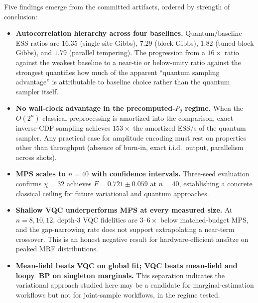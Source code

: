 \documentclass[conference,10pt]{IEEEtran}
\begin{document}
Five findings emerge from the committed artifacts, ordered by strength of conclusion:
\begin{itemize}[leftmargin=*, topsep=0pt, partopsep=0pt, itemsep=3pt, parsep=0pt]
    \item \textbf{Autocorrelation hierarchy across four baselines.} Quantum/baseline ESS ratios are $16.35$ (single-site Gibbs), $7.29$ (block Gibbs), $1.82$ (tuned-block Gibbs), and $1.79$ (parallel tempering). The progression from a $16\times$ ratio against the weakest baseline to a near-tie or below-unity ratio against the strongest quantifies how much of the apparent ``quantum sampling advantage'' is attributable to baseline choice rather than the quantum sampler itself.
    \item \textbf{No wall-clock advantage in the precomputed-$P_\theta$ regime.} When the $O(2^n)$ classical preprocessing is amortized into the comparison, exact inverse-CDF sampling achieves $153\times$ the amortized ESS/s of the quantum sampler. Any practical case for amplitude encoding must rest on properties other than throughput (absence of burn-in, exact i.i.d.\ output, parallelism across shots).
    \item \textbf{MPS scales to $n=40$ with confidence intervals.} Three-seed evaluation confirms $\chi=32$ achieves $F=0.721\pm0.059$ at $n=40$, establishing a concrete classical ceiling for future variational and quantum approaches.
    \item \textbf{Shallow VQC underperforms MPS at every measured size.} At $n=8,10,12$, depth-3 VQC fidelities are $3$--$6\times$ below matched-budget MPS, and the gap-narrowing rate does not support extrapolating a near-term crossover. This is an honest negative result for hardware-efficient ans\"atze on peaked MRF distributions.
    \item \textbf{Mean-field beats VQC on global fit; VQC beats mean-field and loopy~BP on singleton marginals.} This separation indicates the variational approach studied here may be a candidate for marginal-estimation workflows but not for joint-sample workflows, in the regime tested.
\end{itemize}
\end{document}
